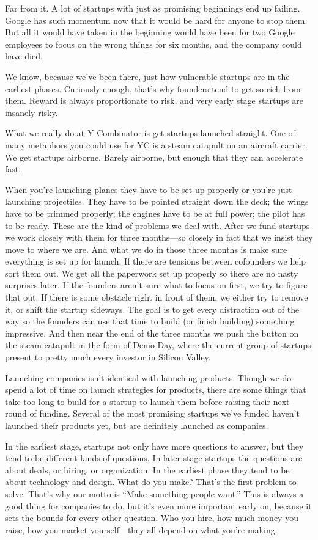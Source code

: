 \documentclass[12pt]{book}
\begin{document}
Far from it. A lot of startups with just as promising beginnings end up
failing. Google has such momentum now that it would be hard for anyone
to stop them. But all it would have taken in the beginning would have
been for two Google employees to focus on the wrong things for six
months, and the company could have died.

We know, because we've been there, just how vulnerable startups are in
the earliest phases. Curiously enough, that's why founders tend to get
so rich from them. Reward is always proportionate to risk, and very
early stage startups are insanely risky.

What we really do at Y Combinator is get startups launched straight. One
of many metaphors you could use for YC is a steam catapult on an
aircraft carrier. We get startups airborne. Barely airborne, but enough
that they can accelerate fast.

When you're launching planes they have to be set up properly or you're
just launching projectiles. They have to be pointed straight down the
deck; the wings have to be trimmed properly; the engines have to be at
full power; the pilot has to be ready. These are the kind of problems we
deal with. After we fund startups we work closely with them for three
months---so closely in fact that we insist they move to where we are.
And what we do in those three months is make sure everything is set up
for launch. If there are tensions between cofounders we help sort them
out. We get all the paperwork set up properly so there are no nasty
surprises later. If the founders aren't sure what to focus on first, we
try to figure that out. If there is some obstacle right in front of
them, we either try to remove it, or shift the startup sideways. The
goal is to get every distraction out of the way so the founders can use
that time to build (or finish building) something impressive. And then
near the end of the three months we push the button on the steam
catapult in the form of Demo Day, where the current group of startups
present to pretty much every investor in Silicon Valley.

Launching companies isn't identical with launching products. Though we
do spend a lot of time on launch strategies for products, there are some
things that take too long to build for a startup to launch them before
raising their next round of funding. Several of the most promising
startups we've funded haven't launched their products yet, but are
definitely launched as companies.

In the earliest stage, startups not only have more questions to answer,
but they tend to be different kinds of questions. In later stage
startups the questions are about deals, or hiring, or organization. In
the earliest phase they tend to be about technology and design. What do
you make? That's the first problem to solve. That's why our motto is
``Make something people want.'' This is always a good thing for
companies to do, but it's even more important early on, because it sets
the bounds for every other question. Who you hire, how much money you
raise, how you market yourself---they all depend on what you're making.
\end{document}
